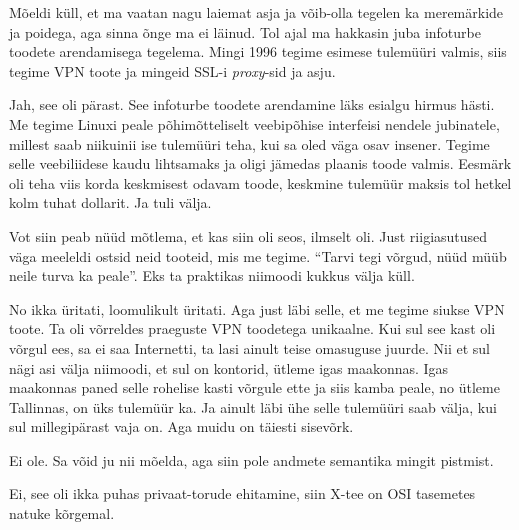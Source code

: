 Mõeldi küll, et ma vaatan nagu laiemat asja ja võib-olla tegelen ka meremärkide ja poidega, aga sinna õnge ma ei läinud. Tol ajal ma hakkasin juba infoturbe toodete arendamisega tegelema. Mingi 1996 tegime esimese tulemüüri valmis, siis tegime  VPN toote ja mingeid SSL-i \emph{proxy}-sid ja asju. 


Jah, see oli pärast. See infoturbe toodete arendamine läks esialgu hirmus hästi. Me tegime Linuxi peale põhimõtteliselt veebipõhise interfeisi nendele jubinatele, millest saab niikuinii ise tulemüüri teha, kui sa oled väga osav insener. Tegime selle veebiliidese kaudu lihtsamaks ja oligi jämedas plaanis toode valmis. Eesmärk oli teha viis korda keskmisest odavam toode, keskmine tulemüür  maksis  tol hetkel kolm tuhat dollarit. Ja tuli välja. 

Vot siin peab nüüd mõtlema, et kas siin oli seos, ilmselt oli. Just riigiasutused väga meeleldi ostsid neid tooteid, mis me tegime. \enquote{Tarvi tegi võrgud, nüüd müüb neile turva ka peale}. Eks ta praktikas niimoodi kukkus välja küll. 


No ikka üritati, loomulikult üritati. Aga just läbi selle, et me tegime siukse VPN toote. Ta oli võrreldes praeguste VPN toodetega unikaalne. Kui sul see kast oli võrgul ees, sa ei saa Internetti,  ta lasi ainult teise omasuguse juurde. Nii et sul nägi asi välja niimoodi, et sul on kontorid, ütleme igas maakonnas.  Igas maakonnas paned selle rohelise kasti võrgule ette ja siis kamba peale, no ütleme Tallinnas,  on üks tulemüür ka. Ja ainult  läbi ühe selle tulemüüri saab välja, kui sul millegipärast vaja on. Aga muidu on täiesti sisevõrk. 


Ei ole. Sa võid ju nii mõelda, aga siin pole andmete semantika mingit pistmist. 


Ei, see oli ikka puhas privaat-torude ehitamine, siin X-tee on OSI tasemetes natuke kõrgemal.


